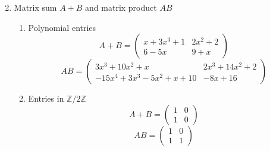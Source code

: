 \documentclass{article}
\begin{document}
\begin{enumerate}
\begin{displaymath}
    \end{displaymath}
    \item Matrix sum $A + B$ and matrix product $AB$
    \begin{enumerate}
        \item Polynomial entries
        \begin{displaymath}
            A + B = \begin{pmatrix}
                x + 3x^3 + 1 & 2x^2 + 2 \\
                6 - 5x & 9 + x
            \end{pmatrix}
        \end{displaymath}
        \begin{displaymath}
            AB = \begin{pmatrix}
                3x^3 + 10x^2 + x & 2x^3 + 14x^2 + 2 \\
                -15x^4 + 3x^3 - 5x^2 + x + 10 & -8x + 16
            \end{pmatrix}
        \end{displaymath}
        \item Entries in $\mathbb{Z} / 2\mathbb{Z}$
        \begin{displaymath}
            A + B = \begin{pmatrix}
                1 & 0 \\
                1 & 0
            \end{pmatrix}
        \end{displaymath}
        \begin{displaymath}
            AB = \begin{pmatrix}
                1 & 0 \\
                1 & 1
            \end{pmatrix}
        \end{displaymath}
    \end{enumerate}
\end{enumerate}
\end{document}
